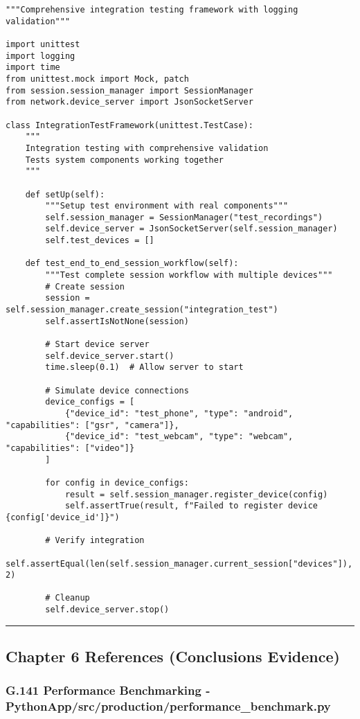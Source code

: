 \documentclass[12pt,a4paper]{article}
\begin{document}
\begin{verbatim}
"""Comprehensive integration testing framework with logging validation"""

import unittest
import logging
import time
from unittest.mock import Mock, patch
from session.session_manager import SessionManager
from network.device_server import JsonSocketServer

class IntegrationTestFramework(unittest.TestCase):
    """
    Integration testing with comprehensive validation
    Tests system components working together
    """
    
    def setUp(self):
        """Setup test environment with real components"""
        self.session_manager = SessionManager("test_recordings")
        self.device_server = JsonSocketServer(self.session_manager)
        self.test_devices = []
    
    def test_end_to_end_session_workflow(self):
        """Test complete session workflow with multiple devices"""
        # Create session
        session = self.session_manager.create_session("integration_test")
        self.assertIsNotNone(session)
        
        # Start device server
        self.device_server.start()
        time.sleep(0.1)  # Allow server to start
        
        # Simulate device connections
        device_configs = [
            {"device_id": "test_phone", "type": "android", "capabilities": ["gsr", "camera"]},
            {"device_id": "test_webcam", "type": "webcam", "capabilities": ["video"]}
        ]
        
        for config in device_configs:
            result = self.session_manager.register_device(config)
            self.assertTrue(result, f"Failed to register device {config['device_id']}")
        
        # Verify integration
        self.assertEqual(len(self.session_manager.current_session["devices"]), 2)
        
        # Cleanup
        self.device_server.stop()
\end{verbatim}

\hrule

\subsection{Chapter 6 References (Conclusions Evidence)}

\subsubsection{G.141 Performance Benchmarking - PythonApp/src/production/performance_benchmark.py}
\end{document}
